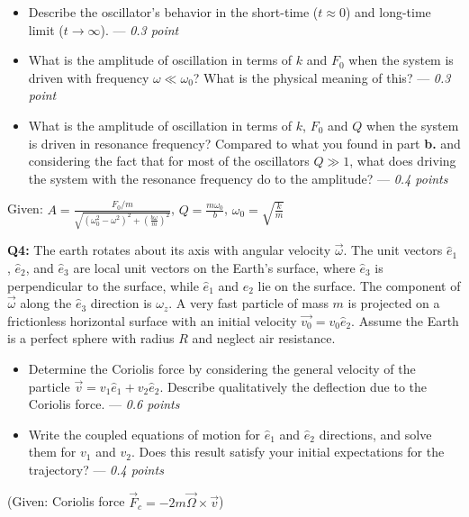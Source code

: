 \documentclass[a4paper,12pt]{article}
\begin{document}
\begin{itemize}
    \item[\textbf{a.}] Describe the oscillator's behavior in the short-time ($t\approx 0$) and long-time limit ($t \to \infty$). --- \textit{0.3 point}
    \item[\textbf{b.}] What is the amplitude of oscillation in terms of $k$ and $F_0$ when the system is driven with frequency $\omega \ll \omega_0$? What is the physical meaning of this? --- \textit{0.3 point}
    \item[\textbf{c.}] What is the amplitude of oscillation in terms of $k$, $F_0$ and $Q$ when the system is driven in resonance frequency? Compared to what you found in part \textbf{b.} and considering the fact that for most of the oscillators $Q\gg 1$, what does driving the system with the resonance frequency do to the amplitude? --- \textit{0.4 points}
\end{itemize}
Given: $A = \frac{F_0/m}{\sqrt{\left(\omega_0^2 - \omega^2\right)^2 + \left(\frac{b \omega}{m}\right)^2}}$, $Q = \frac{m \omega_0}{b}$, $\omega_0 = \sqrt{\frac{k}{m}}$


\vspace*{0.1cm}
\textbf{Q4:} The earth rotates about its axis with angular velocity $\vec{\omega}$. The unit vectors $\hat{e}_1$, $\hat{e}_2$, and $\hat{e}_3$ are local unit vectors on the Earth's surface, where $\hat{e}_3$ is perpendicular to the surface, while $\hat{e}_1$ and $\hat{e}_2$ lie on the surface. The component of $\vec{\omega}$ along the $\hat{e}_3$ direction is $\omega_z$. A very fast particle of mass $m$ is projected on a frictionless horizontal surface with an initial velocity $\vec{v_0}=v_0\hat{e}_2$. Assume the Earth is a perfect sphere with radius $R$ and neglect air resistance.

\begin{itemize}
    \item[\textbf{a.}] Determine the Coriolis force by considering the general velocity of the particle $\vec{v}=v_1\hat{e}_1+v_2\hat{e}_2$. Describe qualitatively the deflection due to the Coriolis force. --- \textit{0.6 points}
    \item[\textbf{b.}] Write the coupled equations of motion for $\hat{e}_1$ and $\hat{e}_2$ directions, and solve them for $v_1$ and $v_2$. Does this result satisfy your initial expectations for the trajectory? --- \textit{0.4 points}
\end{itemize}


(Given: Coriolis force $\vec{F}_c = -2m \vec{\Omega} \times \vec{v}$)
\end{document}
